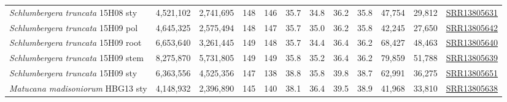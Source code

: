\documentclass[11pt]{article}
\begin{document}
\begin{supptable}[ht]
{\begin{tabular}{l|cc|cc|cc|cc|cc|c}
\textit{Schlumbergera truncata} 15H08 sty   & 4,521,102 & 2,741,695 & 148 & 146 & 35.7 & 34.8 & 36.2 & 35.8 & 47,754 & 29,812 & \href{https://trace.ncbi.nlm.nih.gov/Traces/sra/?run=SRR13805631}{SRR13805631} \\
\textit{Schlumbergera truncata} 15H09 pol   & 4,645,325 & 2,575,494 & 148 & 147 & 35.7 & 35.0 & 36.2 & 35.8 & 42,245 & 27,650 & \href{https://trace.ncbi.nlm.nih.gov/Traces/sra/?run=SRR13805642}{SRR13805642} \\
\textit{Schlumbergera truncata} 15H09 root  & 6,653,640 & 3,261,445 & 149 & 148 & 35.7 & 34.4 & 36.4 & 36.2 & 68,427 & 48,463 & \href{https://trace.ncbi.nlm.nih.gov/Traces/sra/?run=SRR13805640}{SRR13805640} \\
\textit{Schlumbergera truncata} 15H09 stem  & 8,275,870 & 5,731,805 & 149 & 149 & 35.8 & 35.2 & 36.4 & 36.2 & 79,859 & 51,788 & \href{https://trace.ncbi.nlm.nih.gov/Traces/sra/?run=SRR13805639}{SRR13805639} \\
\textit{Schlumbergera truncata} 15H09 sty   & 6,363,556 & 4,525,356 & 147 & 138 & 38.8 & 35.8 & 39.8 & 38.7 & 62,991 & 36,275 & \href{https://trace.ncbi.nlm.nih.gov/Traces/sra/?run=SRR13805651}{SRR13805651} \\
\textit{Matucana madisoniorum} HBG13 sty    & 4,148,932 & 2,396,890 & 145 & 140 & 38.1 & 36.4 & 39.5 & 38.9 & 41,968 & 33,810 & \href{https://trace.ncbi.nlm.nih.gov/Traces/sra/?run=SRR13805638}{SRR13805638} \\
\bottomrule
\end{tabular}}
\end{supptable}
\end{document}
